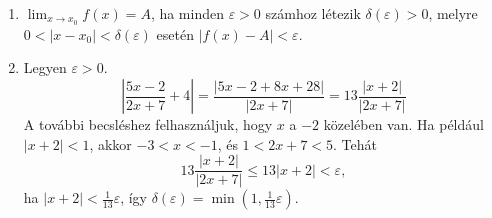 \documentclass[11pt]{scrartcl}
\begin{document}
\begin{enumerate}
	\item $\lim_{x \to x_0} f(x) = A$, ha minden $\varepsilon > 0$ számhoz
	      létezik $\delta(\varepsilon) > 0$, melyre
	      $0 < |x - x_0| < \delta(\varepsilon)$ esetén
	      $|f(x) - A| < \varepsilon$.

	\item Legyen $\varepsilon > 0$.
	      \[
		      \left| \frac{5x - 2}{2x + 7} + 4 \right|
		      = \frac{|5x - 2 + 8x + 28|}{|2x + 7|}
		      = 13 \frac{|x + 2|}{|2x + 7|}
	      \]
	      A további becsléshez felhasználjuk, hogy $x$ a $-2$ közelében van. Ha
	      például $|x + 2| < 1$, akkor $-3 < x < -1$, és $1 < 2x + 7 < 5$.
	      Tehát
	      \[
		      13 \frac{|x + 2|}{|2x + 7|} \le 13 |x + 2| < \varepsilon,
	      \]
	      ha $|x + 2| < \frac{1}{13} \varepsilon$, így
	      \(
	      \delta(\varepsilon) = \min\left(1, \frac{1}{13} \varepsilon\right)
	      \).
\end{enumerate}
\end{document}
